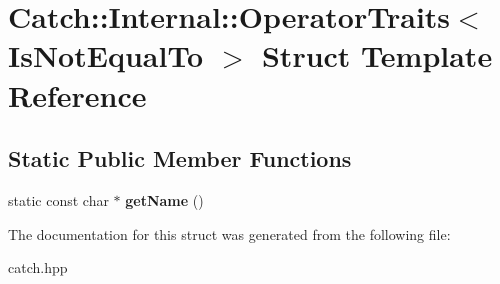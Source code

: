 \hypertarget{struct_catch_1_1_internal_1_1_operator_traits_3_01_is_not_equal_to_01_4}{}\section{Catch\+:\+:Internal\+:\+:Operator\+Traits$<$ Is\+Not\+Equal\+To $>$ Struct Template Reference}
\label{struct_catch_1_1_internal_1_1_operator_traits_3_01_is_not_equal_to_01_4}
\subsection*{Static Public Member Functions}
\begin{DoxyCompactItemize}
\item 
\mbox{\label{struct_catch_1_1_internal_1_1_operator_traits_3_01_is_not_equal_to_01_4_a54a795b8bf7c80a9fdbc7b81f39133b4}} 
static const char $\ast$ {\bfseries get\+Name} ()
\end{DoxyCompactItemize}


The documentation for this struct was generated from the following file\+:\begin{DoxyCompactItemize}
\item 
catch.\+hpp\end{DoxyCompactItemize}
